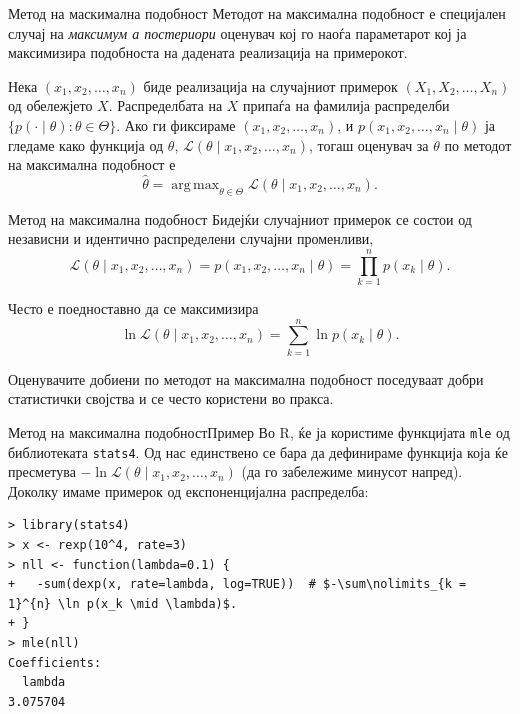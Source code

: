 \documentclass[hyperref={unicode}, xcolor={svgnames, table},
usepdftitle=false]{beamer}
\DeclareMathOperator*{\argmax}{arg\,max}
\theoremstyle{remark}
\begin{document}
\begin{frame}{Метод на маскимална подобност}
  Методот на максимална подобност е специјален случај на \emph{максимум а
    постериори} оценувач кој го наоѓа параметарот кој ја максимизира подобноста
  на дадената реализација на примерокот.
  \begin{definition}
    Нека \((x_1, x_2, \ldots, x_n)\) биде реализација на случајниот примерок
    \((X_1, X_2, \ldots, X_n)\) од обележјето \(X\).  Распределбата на \(X\)
    припаѓа на фамилија распределби
    \(\{p(\cdot \mid \theta) : \theta \in \Theta\}\).  Ако ги фиксираме
    \((x_1, x_2, \ldots, x_n)\), и \(p(x_1, x_2, \ldots, x_n \mid \theta)\) ја
    гледаме како функција од \(\theta\),
    \(\mathcal{L}(\theta \mid x_1, x_2, \ldots, x_n)\), тогаш оценувач за
    \(\theta\) по методот на максимална подобност е
    \[
      \hat{\theta} = \argmax_{\theta \in \Theta} \mathcal{L}(\theta \mid x_1,
      x_2, \ldots, x_n)\text{.}
    \]
  \end{definition}
\end{frame}

\begin{frame}{Метод на максимална подобност}
  Бидејќи случајниот примерок се состои од независни и идентично распределени
  случајни променливи,
  \[
    \mathcal{L}(\theta \mid x_1, x_2, \ldots, x_n) = p(x_1, x_2, \ldots, x_n
    \mid \theta) = \prod\limits_{k = 1}^{n} p(x_k \mid \theta)\text{.}
  \]

  Често е поедноставно да се максимизира
  \[
    \ln \mathcal{L}(\theta \mid x_1, x_2, \ldots, x_n) = \sum\limits_{k = 1}^{n}
    \ln p(x_k \mid \theta)\text{.}
  \]

  Оценувачите добиени по методот на максимална подобност поседуваат добри
  статистички својства и се често користени во пракса.
\end{frame}

\begin{frame}[fragile]{Метод на максимална подобност}{Пример}
  Во R, ќе ја користиме функцијата \texttt{mle} од библиотеката
  \texttt{stats4}.  Од нас единствено се бара да дефинираме функција која
  ќе пресметува \(-\ln \mathcal{L}(\theta \mid x_1, x_2, \ldots, x_n)\) (да го
  забележиме минусот напред).  Доколку имаме примерок од експоненцијална
  распределба:
\begin{verbatim}
> library(stats4)
> x <- rexp(10^4, rate=3)
> nll <- function(lambda=0.1) {
+   -sum(dexp(x, rate=lambda, log=TRUE))  # $-\sum\nolimits_{k = 1}^{n} \ln p(x_k \mid \lambda)$.
+ }
> mle(nll)
Coefficients:
  lambda
3.075704
\end{verbatim}
\end{frame}
\end{document}
